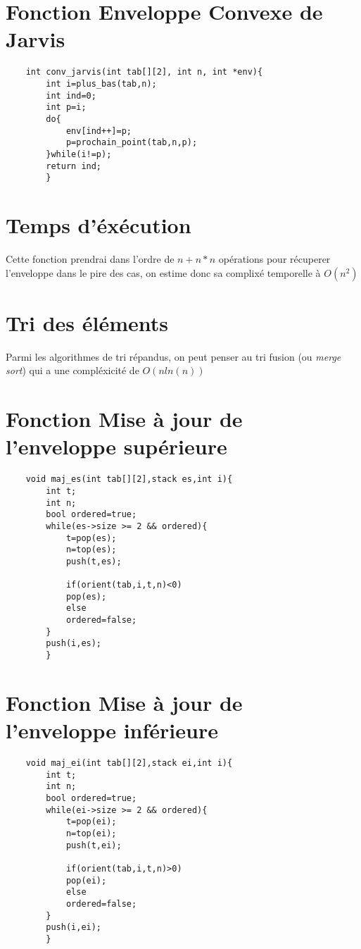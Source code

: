 \documentclass{article}
\begin{document}
\section{Fonction Enveloppe Convexe de Jarvis}
\begin{verbatim}
    int conv_jarvis(int tab[][2], int n, int *env){
        int i=plus_bas(tab,n);
        int ind=0;
        int p=i;
        do{
            env[ind++]=p;
            p=prochain_point(tab,n,p);
        }while(i!=p);
        return ind;
        }
\end{verbatim}
\section{Temps d'éxécution}
Cette fonction prendrai dans l'ordre de $n+n*n$ opérations pour récuperer l'enveloppe dans le pire des cas, on estime donc sa complixé temporelle à $O(n^2)$

\section{Tri des éléments}
Parmi les algorithmes de tri répandus, on peut penser au tri fusion (ou \textit{merge sort}) qui a une compléxicité de $O(n ln(n))$
\section{Fonction Mise à jour de l'enveloppe supérieure}
\begin{verbatim}
    void maj_es(int tab[][2],stack es,int i){
        int t;
        int n;
        bool ordered=true;
        while(es->size >= 2 && ordered){
            t=pop(es);
            n=top(es);
            push(t,es);

            if(orient(tab,i,t,n)<0)
            pop(es);
            else
            ordered=false;
        }
        push(i,es);
        }
\end{verbatim}
\section{Fonction Mise à jour de l'enveloppe inférieure}
\begin{verbatim}
    void maj_ei(int tab[][2],stack ei,int i){
        int t;
        int n;
        bool ordered=true;
        while(ei->size >= 2 && ordered){
            t=pop(ei);
            n=top(ei);
            push(t,ei);

            if(orient(tab,i,t,n)>0)
            pop(ei);
            else
            ordered=false;
        }
        push(i,ei);
        }
\end{verbatim}
\end{document}
